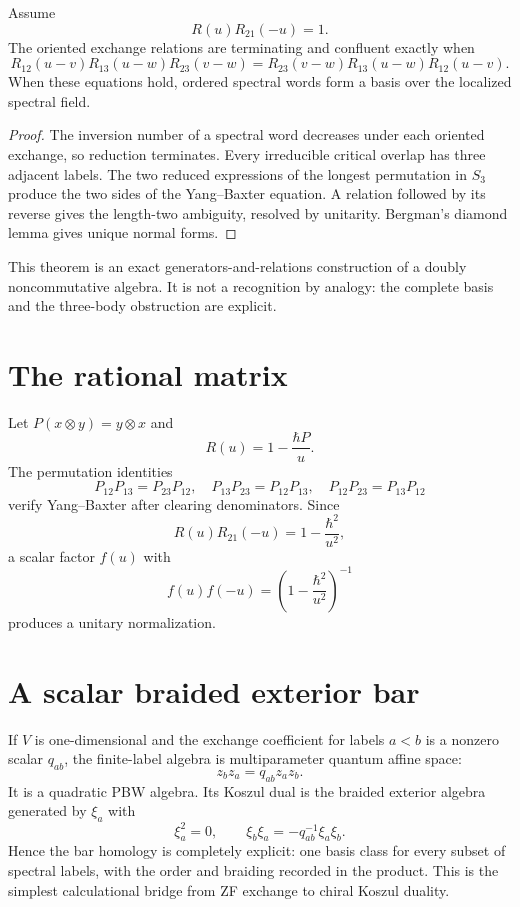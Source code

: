 \begin{theorem}\label{thm:zf-diamond}
Assume
\[
 R(u)R_{21}(-u)=1.
\]
The oriented exchange relations are terminating and confluent exactly when
\[
 R_{12}(u-v)R_{13}(u-w)R_{23}(v-w)
 =R_{23}(v-w)R_{13}(u-w)R_{12}(u-v).
\]
When these equations hold, ordered spectral words form a basis over the localized spectral field.
\end{theorem}
\begin{proof}
The inversion number of a spectral word decreases under each oriented exchange, so reduction terminates.  Every irreducible critical overlap has three adjacent labels.  The two reduced expressions of the longest permutation in \(S_3\) produce the two sides of the Yang--Baxter equation.  A relation followed by its reverse gives the length-two ambiguity, resolved by unitarity.  Bergman's diamond lemma gives unique normal forms.
\end{proof}

This theorem is an exact generators-and-relations construction of a doubly noncommutative algebra.  It is not a recognition by analogy: the complete basis and the three-body obstruction are explicit.

\section{The rational matrix}
Let \(P(x\otimes y)=y\otimes x\) and
\[
 R(u)=1-\frac{\hbar P}{u}.
\]
The permutation identities
\[
 P_{12}P_{13}=P_{23}P_{12},\quad
 P_{13}P_{23}=P_{12}P_{13},\quad
 P_{12}P_{23}=P_{13}P_{12}
\]
verify Yang--Baxter after clearing denominators.  Since
\[
 R(u)R_{21}(-u)=1-\frac{\hbar^2}{u^2},
\]
a scalar factor \(f(u)\) with
\[
 f(u)f(-u)=\left(1-\frac{\hbar^2}{u^2}\right)^{-1}
\]
produces a unitary normalization.

\section{A scalar braided exterior bar}
If \(V\) is one-dimensional and the exchange coefficient for labels \(a<b\) is a nonzero scalar \(q_{ab}\), the finite-label algebra is multiparameter quantum affine space:
\[
 z_bz_a=q_{ab}z_az_b.
\]
It is a quadratic PBW algebra.  Its Koszul dual is the braided exterior algebra generated by \(\xi_a\) with
\[
 \xi_a^2=0,
 \qquad
 \xi_b\xi_a=-q_{ab}^{-1}\xi_a\xi_b.
\]
Hence the bar homology is completely explicit: one basis class for every subset of spectral labels, with the order and braiding recorded in the product.  This is the simplest calculational bridge from ZF exchange to chiral Koszul duality.

